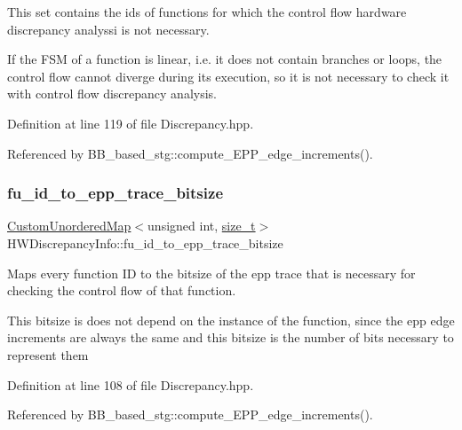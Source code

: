 This set contains the ids of functions for which the control flow hardware discrepancy analyssi is not necessary. 

If the F\+SM of a function is linear, i.\+e. it does not contain branches or loops, the control flow cannot diverge during its execution, so it is not necessary to check it with control flow discrepancy analysis. 

Definition at line 119 of file Discrepancy.\+hpp.



Referenced by B\+B\+\_\+based\+\_\+stg\+::compute\+\_\+\+E\+P\+P\+\_\+edge\+\_\+increments().

\mbox{\label{structHWDiscrepancyInfo_a0fd896762ccd15ce8051101f9cad3469}} 
\subsubsection{\texorpdfstring{fu\+\_\+id\+\_\+to\+\_\+epp\+\_\+trace\+\_\+bitsize}{fu\_id\_to\_epp\_trace\_bitsize}}
{\footnotesize\ttfamily \hyperlink{custom__map_8hpp_ad1ed68f2ff093683ab1a33522b144adc}{Custom\+Unordered\+Map}$<$unsigned int, \hyperlink{tutorial__fpt__2017_2intro_2sixth_2test_8c_a7c94ea6f8948649f8d181ae55911eeaf}{size\+\_\+t}$>$ H\+W\+Discrepancy\+Info\+::fu\+\_\+id\+\_\+to\+\_\+epp\+\_\+trace\+\_\+bitsize}



Maps every function ID to the bitsize of the epp trace that is necessary for checking the control flow of that function. 

This bitsize is does not depend on the instance of the function, since the epp edge increments are always the same and this bitsize is the number of bits necessary to represent them 

Definition at line 108 of file Discrepancy.\+hpp.



Referenced by B\+B\+\_\+based\+\_\+stg\+::compute\+\_\+\+E\+P\+P\+\_\+edge\+\_\+increments().

\mbox{\label{structHWDiscrepancyInfo_a7007e3390d5722c68c99964ea99a845b}} 
